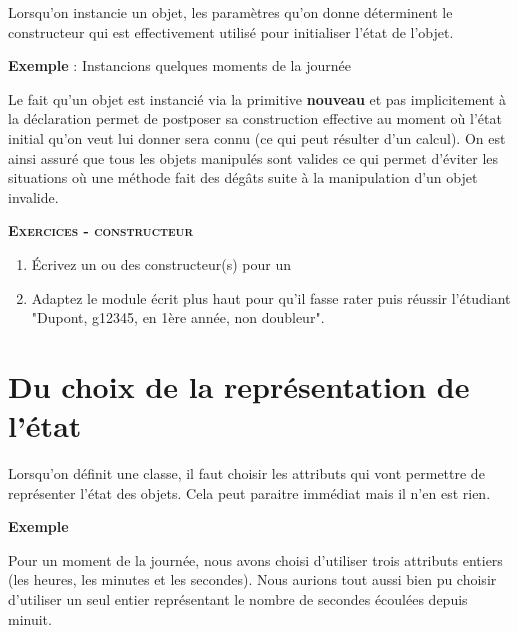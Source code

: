 Lorsqu'on instancie un objet, les paramètres
qu'on donne déterminent le constructeur qui est
effectivement utilisé pour initialiser l'état de
l'objet.

{
\textbf{Exemple} : Instancions quelques moments de la journée}


Le fait qu'un objet est instancié via la primitive
\textbf{nouveau} et pas implicitement à la déclaration permet de
postposer sa construction effective au moment où
l'état initial qu'on veut lui donner
sera connu (ce qui peut résulter d'un calcul). On est
ainsi assuré que tous les objets manipulés sont valides ce qui permet
d’éviter les situations où une méthode fait des dégâts suite à la
manipulation d’un objet invalide.

{\sffamily\bfseries\scshape
Exercices - constructeur}

\liststyleWWviiiNumi
\begin{enumerate}
	\item {
		Écrivez un ou des constructeur(s) pour un }
	\item {
		Adaptez le module écrit plus haut pour qu'il fasse rater 
		puis réussir l'étudiant "Dupont, g12345, en 1ère année,
		non doubleur".}
\end{enumerate}

\bigskip


\section{Du choix de la représentation de l'état}

Lorsqu'on définit une classe, il faut choisir les
attributs qui vont permettre de représenter l'état des
objets. Cela peut paraitre immédiat mais il n'en est
rien.

{\bfseries
Exemple}

Pour un moment de la journée, nous avons choisi
d'utiliser trois attributs entiers (les heures, les
minutes et les secondes). Nous aurions tout aussi bien pu choisir
d'utiliser un seul entier représentant le nombre de
secondes écoulées depuis minuit.


